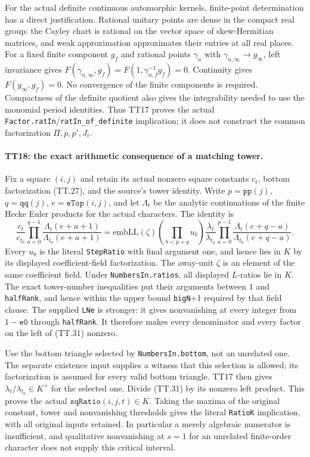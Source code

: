 For the actual definite continuous automorphic kernels,
finite-point determination has a direct justification. Rational
unitary points are dense in the compact real group: the Cayley
chart is rational on the vector space of skew-Hermitian matrices,
and weak approximation approximates their entries at all real
places. For a fixed finite component $g_f$ and rational points
$\gamma_n$ with $\gamma_{n,\infty}\to g_\infty$, left
invariance gives
$F(\gamma_{n,\infty},g_f)=F(1,\gamma_{n,f}^{-1}g_f)=0$.
Continuity gives $F(g_\infty,g_f)=0$. No convergence of the finite
components is required. Compactness of the definite quotient
also gives the integrability needed to use the monomial period
identities. Thus TT17 proves the actual
\texttt{Factor.ratIn}/\texttt{ratIn\_of\_definite} implication;
it does not construct the common factorization $\Pi,p,p',J_t$.

\paragraph{TT18: the exact arithmetic consequence of a matching tower.}
Fix a square $(i,j)$ and retain its actual nonzero square
constants $c_t$, bottom factorization (TT.27), and the source's
tower identity. Write $p=\texttt{pp}(j)$,
$q=\texttt{qq}(j)$, $e=\texttt{eTop}(i,j)$, and let
$\Lambda_t$ be the analytic continuations of the finite Hecke Euler products
for the actual characters. The identity is
\[
 \frac{c_t}{c_{t_0}}\prod_{a=0}^{q-1}
       \frac{\Lambda_t(e+a+1)}{\Lambda_{t_0}(e+a+1)}
 =\mathrm{embLL}(\zeta)\left(\prod_{b<p+q}u_b\right)
       \frac{\lambda_t}{\lambda_{t_0}}
       \prod_{a=0}^{p-1}
       \frac{\Lambda_t(e+q-a)}{\Lambda_{t_0}(e+q-a)}.        \tag{TT.31}
\]
Every $u_b$ is the literal \texttt{StepRatio} with final argument
one, and hence lies in $K$ by its displayed coefficient-field
factorization. The away-unit $\zeta$ is an element of the same
coefficient field. Under \texttt{NumbersIn.ratios}, all displayed
$L$-ratios lie in $K$. The exact tower-number inequalities put
their arguments between $1$ and \texttt{halfRank}, and hence
within the upper bound \texttt{bigN}+1 required by that field
clause. The supplied \texttt{LNe} is stronger: it gives
nonvanishing at every integer from $1-\texttt{e0}$ through
\texttt{halfRank}. It therefore makes every denominator and
every factor on the left of (TT.31) nonzero.

Use the bottom triangle selected by \texttt{NumbersIn.bottom},
not an unrelated one. The separate existence input supplies a
witness that this selection is allowed; its factorization is
assumed for every valid bottom triangle. TT17 then gives
$\lambda_t/\lambda_{t_0}\in K^\times$ for the selected one.
Divide (TT.31) by its nonzero left product. This proves the actual
$\texttt{sqRatio}(i,j,t)\in K$. Taking the maxima of the original
constant, tower and nonvanishing thresholds gives the literal
\texttt{RatioK} implication, with all original inputs retained.
In particular a merely algebraic numerator is insufficient, and
qualitative nonvanishing at $s=1$ for an unrelated finite-order
character does not supply this critical interval.

